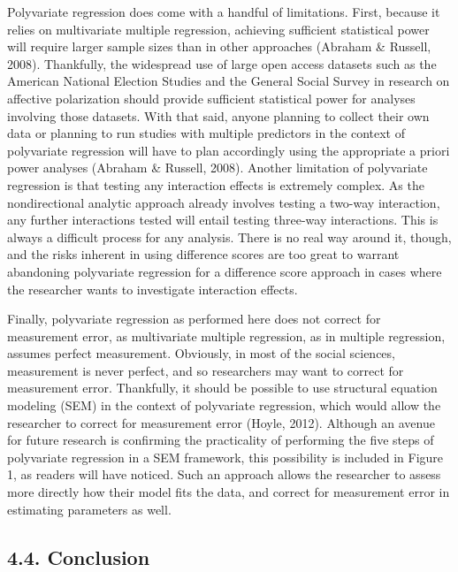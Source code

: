 \documentclass[authordate, meta, issue]{jote-new-article}
\begin{document}
	Polyvariate regression does come with a handful of limitations. First, because it relies on multivariate multiple regression, achieving sufficient statistical power will require larger sample sizes than in other approaches (Abraham \& Russell, 2008). Thankfully, the widespread use of large open access datasets such as the American National Election Studies and the General Social Survey in research on affective polarization should provide sufficient statistical power for analyses involving those datasets. With that said, anyone planning to collect their own data or planning to run studies with multiple predictors in the context of polyvariate regression will have to plan accordingly using the appropriate a priori power analyses (Abraham \& Russell, 2008). Another limitation of polyvariate regression is that testing any interaction effects is extremely complex. As the nondirectional analytic approach already involves testing a two-way interaction, any further interactions tested will entail testing three-way interactions. This is always a difficult process for any analysis. There is no real way around it, though, and the risks inherent in using difference scores are too great to warrant abandoning polyvariate regression for a difference score approach in cases where the researcher wants to investigate interaction effects.



	Finally, polyvariate regression as performed here does not correct for measurement error, as multivariate multiple regression, as in multiple regression, assumes perfect measurement. Obviously, in most of the social sciences, measurement is never perfect, and so researchers may want to correct for measurement error. Thankfully, it should be possible to use structural equation modeling (SEM) in the context of polyvariate regression, which would allow the researcher to correct for measurement error (Hoyle, 2012). Although an avenue for future research is confirming the practicality of performing the five steps of polyvariate regression in a SEM framework, this possibility is included in Figure 1, as readers will have noticed. Such an approach allows the researcher to assess more directly how their model fits the data, and correct for measurement error in estimating parameters as well.



	\subsection{4.4. Conclusion}
\end{document}
